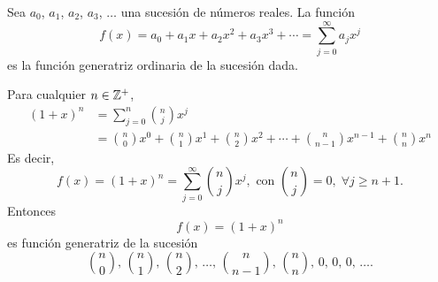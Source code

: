 \begin{definicion}{}{}
    Sea $a_0$, $a_1$, $a_2$, $a_3$, $\dots$ una sucesión de números reales. La función
    $$f(x) = a_0 + a_1x + a_2x^2 + a_3x^3 + \cdots = \sum_{j=0}^{\infty} a_jx^j$$
    es la función generatriz ordinaria de la sucesión dada.
\end{definicion}

\begin{myexample}
    Para cualquier $n \in \ZZ[+]$,
    \begin{align*}
        (1 + x)^n & = \sum_{j=0}^{n}\binom{n}{j} x^j \\
        & = \binom{n}{0} x^0 + \binom{n}{1} x^1 + \binom{n}{2} x^2 + \cdots + \binom{n}{n-1} x^{n-1} + \binom{n}{n} x^n
    \end{align*}
    Es decir,
    $$f(x) = (1+x)^n = \sum_{j=0}^{\infty} \binom{n}{j} x^j, \text{ con } \binom{n}{j} = 0, \; \forall j \geq n+1.$$
    Entonces
    $$f(x) = (1+x)^n$$
    es función generatriz de la sucesión
    $$\binom{n}{0}, \, \binom{n}{1}, \, \binom{n}{2}, \, \dots, \, \binom{n}{n-1}, \, \binom{n}{n}, \, 0, \, 0, \, 0, \, \dots.$$
\end{myexample}

